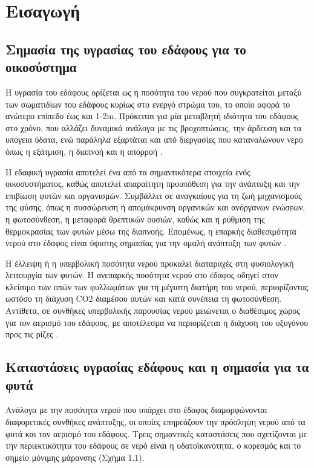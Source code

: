 \chapter{Εισαγωγή}
\label{ch:introduction}

\section{Σημασία της υγρασίας του εδάφους για το οικοσύστημα}


\par Η υγρασία του εδάφους ορίζεται ως η ποσότητα του νερού που συγκρατείται μεταξύ των σωματιδίων του εδάφους κυρίως στο ενεργό στρώμα του, το οποίο αφορά το ανώτερο επίπεδο έως και 1-2m. Πρόκειται για μία μεταβλητή ιδιότητα του εδάφους στο χρόνο, που αλλάζει δυναμικά ανάλογα με τις βροχοπτώσεις, την άρδευση και τα υπόγεια ύδατα, ενώ παράληλα εξαρτάται και από διεργασίες που καταναλώνουν νερό όπως η εξάτμιση, η διαπνοή και η απορροή \cite{ref43}. 

\par Η εδαφική υγρασία αποτελεί ένα από τα σημαντικότερα στοιχεία ενός οικοσυστήματος, καθώς αποτελεί απαραίτητη προυπόθεση για την ανάπτυξη και την επιβίωση  φυτών και οργανισμών. Συμβάλλει σε αναγκαίους για τη ζωή μηχανισμούς της φύσης, όπως η συσσώρευση ή απομάκρυνση οργανικών και ανόργανων ενώσεων, η φωτοσύνθεση, η μεταφορά θρεπτικών ουσιών, καθώς και η ρύθμιση της θερμοκρασίας των φυτών μέσω της διαπνοής. Επομένως, η επαρκής διαθεσιμότητα νερού στο έδαφος είναι ύψιστης σημασίας για την ομαλή ανάπτυξη των φυτών \cite{ref44} .

\par  Η έλλειψη ή η υπερβολική ποσότητα νερού προκαλεί διαταραχές στη φυσιολογική λειτουργία των φυτών. Η ανεπαρκής ποσότητα νερού στο έδαφος οδηγεί στον κλείσιμο των οπών των φυλλωμάτων για τη μέγιστη διατήρη του νερού, περιορίζοντας ωστόσο τη διάχυση CO2 διαμέσου αυτών και κατά συνέπεια τη φωτοσύνθεση. Αντίθετα, σε συνθήκες υπερβολικής παρουσίας νερού μειώνεται ο διαθέσιμος χώρος για τον αερισμό του εδάφους, με αποτέλεσμα να περιορίζεται η διάχυση του οξυγόνου προς τις ρίζες \cite{ref43}. 

\section{Καταστάσεις υγρασίας εδάφους και η σημασία για τα φυτά}

Ανάλογα με την ποσότητα νερού που υπάρχει στο έδαφος διαμορφώνονται διαφορετικές συνθήκες ανάπτυξης, οι οποίες επηρεάζουν την πρόσληψη νερού από τα φυτά και τον αερισμό του εδάφους. Τρεις σημαντικές καταστάσεις που σχετίζονται με την περιεκτικότητα του εδάφους σε νερό είναι η υδατοϊκανότητα, ο κορεσμός και το σημείο μόνιμης μάρανσης \cite{ref41} \cite{ref42} (Σχήμα 1.1).

